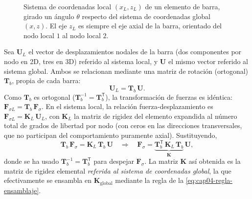 \begin{figure}[htbp]
\centering
{}
\caption{Sistema de coordenadas local $(x_L,z_L)$ de un elemento de barra, girado un ángulo $\theta$ respecto del sistema de coordenadas global $(x,z)$. El eje $z_L$ es siempre el eje axial de la barra, orientado del nodo local $1$ al nodo local $2$.}
\label{fig:cap04-rotacion-local-global}
\end{figure}

Sea $\mathbf{U}_L$ el vector de desplazamientos nodales de la barra (dos componentes por nodo en 2D, tres en 3D) referido al sistema local, y $\mathbf{U}$ el mismo vector referido al sistema global. Ambos se relacionan mediante una matriz de rotación (ortogonal) $\mathbf{T}_b$, propia de cada barra:
\[
\mathbf{U}_L = \mathbf{T}_b\,\mathbf{U} .
\]
Como $\mathbf{T}_b$ es ortogonal ($\mathbf{T}_b^{-1}=\mathbf{T}_b^{\mathsf T}$), la transformación de fuerzas es idéntica: $\mathbf{F}_{\sigma L} = \mathbf{T}_b\,\mathbf{F}_\sigma$. En el sistema local, la relación fuerza-desplazamiento es $\mathbf{F}_{\sigma L} = \mathbf{K}_L\,\mathbf{U}_L$, con $\mathbf{K}_L$ la matriz de rigidez del elemento expandida al número total de grados de libertad por nodo (con ceros en las direcciones transversales, que no participan del comportamiento puramente axial). Sustituyendo,
\[
\mathbf{T}_b\,\mathbf{F}_\sigma = \mathbf{K}_L\,\mathbf{T}_b\,\mathbf{U} \quad\Longrightarrow\quad \mathbf{F}_\sigma = \underbrace{\mathbf{T}_b^{\mathsf T}\,\mathbf{K}_L\,\mathbf{T}_b}_{\displaystyle \mathbf{K}}\,\mathbf{U} ,
\]
donde se ha usado $\mathbf{T}_b^{-1}=\mathbf{T}_b^{\mathsf T}$ para despejar $\mathbf{F}_\sigma$. La matriz $\mathbf{K}$ así obtenida es la matriz de rigidez elemental \emph{referida al sistema de coordenadas global}, la que efectivamente se ensambla en $\mathbf{K}_{\text{global}}$ mediante la regla de la \cref{eq:cap04-regla-ensamblaje}.

